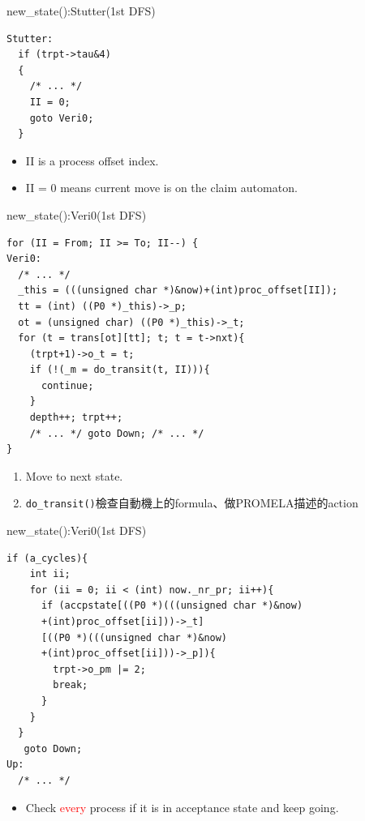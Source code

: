 \documentclass[12pt]{beamer}
\newcommand{\code}[1]{\texttt{#1}}
\begin{document}
\begin{frame}[fragile]{new\_state():Stutter(1st DFS)}
\begin{lstlisting}[basicstyle=\normalsize\ttfamily]
Stutter:
  if (trpt->tau&4)
  {
    /* ... */
    II = 0;
    goto Veri0;
  }
\end{lstlisting}
\begin{itemize}
	\item II is a process offset index.
	\item II = 0 means current move is on the claim automaton.
\end{itemize}
\end{frame}

\begin{frame}[fragile]{new\_state():Veri0(1st DFS)}
\begin{lstlisting}[basicstyle=\footnotesize\ttfamily]
for (II = From; II >= To; II--) {
Veri0:
  /* ... */
  _this = (((unsigned char *)&now)+(int)proc_offset[II]);
  tt = (int) ((P0 *)_this)->_p;
  ot = (unsigned char) ((P0 *)_this)->_t;
  for (t = trans[ot][tt]; t; t = t->nxt){
    (trpt+1)->o_t = t;
    if (!(_m = do_transit(t, II))){
      continue;
    }
    depth++; trpt++;
    /* ... */ goto Down; /* ... */
}
\end{lstlisting}
	\begin{enumerate}
	\item Move to next state.
	\item \code{do\_transit()}檢查自動機上的formula、做PROMELA描述的action
	\end{enumerate}
\end{frame}

\begin{frame}[fragile]{new\_state():Veri0(1st DFS)}
\begin{lstlisting}[basicstyle=\footnotesize\ttfamily]
  if (a_cycles){
    int ii;
    for (ii = 0; ii < (int) now._nr_pr; ii++){
      if (accpstate[((P0 *)(((unsigned char *)&now)
      +(int)proc_offset[ii]))->_t]
      [((P0 *)(((unsigned char *)&now)
      +(int)proc_offset[ii]))->_p]){ 
        trpt->o_pm |= 2;
        break;
      }
    }
  }
   goto Down;
Up:
  /* ... */
\end{lstlisting}
\begin{itemize}
	\item Check \textcolor{red}{every} process if it is in acceptance state and keep going.
\end{itemize}
\end{frame}
\end{document}
